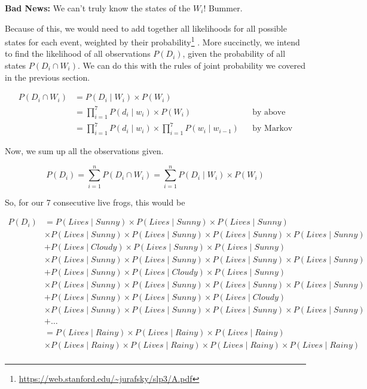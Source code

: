 \documentclass[
]{book}
\begin{document}
\hfill\break

\textbf{Bad News:} We can't truly know the states of the \(W_i\)! Bummer.

Because of this, we would need to add together all likelihoods for all possible states for each event, weighted by their probability\footnote{\url{https://web.stanford.edu/~jurafsky/slp3/A.pdf}} . More succinctly, we intend to find the likelihood of all observations \(P(D_i)\), given the probability of all states \(P(D_i \cap W_i)\). We can do this with the rules of joint probability we covered in the previous section.

\begin{align*}
P(D_i \cap W_i) &= P(D_i \mid W_i)\times P(W_i) \\
&= \prod_{i=1}^7 P(d_i \mid w_i) \times P(W_i) && \text{by above}\\
&= \prod_{i=1}^7 P(d_i \mid w_i) \times \prod_{i=1}^7 P(w_i \mid w_{i-1}) && \text{by Markov}
\end{align*}

Now, we sum up all the observations given.

\[P(D_i) = \sum_{i=1}^n P(D_i \cap W_i) = \sum_{i=1}^n P(D_i \mid W_i)\times P(W_i)\]

So, for our 7 consecutive live frogs, this would be

\begin{align*}
P(D_i) &=P(Lives \mid Sunny) \times P(Lives \mid Sunny)\times P(Lives \mid Sunny)\\
&\times P(Lives \mid Sunny)\times P(Lives \mid Sunny)  \times P(Lives \mid Sunny)  \times P(Lives \mid Sunny) \\[10pt]
& + P(Lives \mid Cloudy) \times P(Lives \mid Sunny)\times P(Lives \mid Sunny)\\
&\times P(Lives \mid Sunny)\times P(Lives \mid Sunny)  \times P(Lives \mid Sunny) \times P(Lives \mid Sunny) \\[10pt]
& + P(Lives \mid Sunny) \times P(Lives \mid Cloudy)\times P(Lives \mid Sunny)\\
&\times P(Lives \mid Sunny)\times P(Lives \mid Sunny)  \times P(Lives \mid Sunny)  \times P(Lives \mid Sunny) \\[10pt]
& + P(Lives \mid Sunny) \times P(Lives \mid Sunny)\times P(Lives \mid Cloudy)\\
&\times P(Lives \mid Sunny)\times P(Lives \mid Sunny)  \times P(Lives \mid Sunny)  \times P(Lives \mid Sunny) \\[10pt]
&+ \dots \\[10pt]
&=P(Lives \mid Rainy) \times P(Lives \mid Rainy)\times P(Lives \mid Rainy)\\
&\times P(Lives \mid Rainy)\times P(Lives \mid Rainy)  \times P(Lives \mid Rainy)  \times P(Lives \mid Rainy) \\[10pt]
\end{align*}
\end{document}
